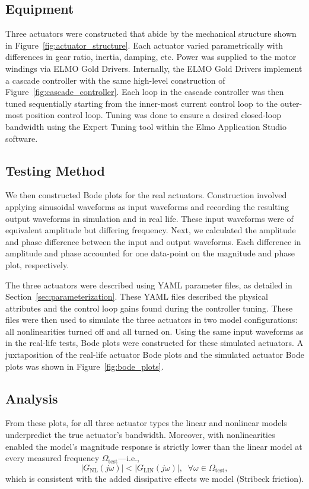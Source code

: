 \documentclass[twocolumn,letterpaper]{IEEEAerospaceCLS}  %
\begin{document}
\subsection{Equipment}
Three actuators were constructed that abide by the mechanical structure shown in Figure~\ref{fig:actuator_structure}. Each actuator varied parametrically with differences in gear ratio, inertia, damping, etc. Power was supplied to the motor windings via ELMO Gold Drivers. Internally, the ELMO Gold Drivers implement a cascade controller with the same high-level construction of Figure~\ref{fig:cascade_controller}. Each loop in the cascade controller was then tuned sequentially starting from the inner-most current control loop to the outer-most position control loop. Tuning was done to ensure a desired closed-loop bandwidth using the Expert Tuning tool within the Elmo Application Studio software.

\subsection{Testing Method}
We then constructed Bode plots for the real actuators. Construction involved applying sinusoidal waveforms as input waveforms and recording the resulting output waveforms in simulation and in real life. These input waveforms were of equivalent amplitude but differing frequency. Next, we calculated the amplitude and phase difference between the input and output waveforms. Each difference in amplitude and phase accounted for one data-point on the magnitude and phase plot, respectively.

The three actuators were described using YAML parameter files, as detailed in Section~\ref{sec:parameterization}. These YAML files described the physical attributes and the control loop gains found during the controller tuning. These files were then used to simulate the three actuators in two model configurations: all nonlinearities turned off and all turned on. Using the same input waveforms as in the real-life tests, Bode plots were constructed for these simulated actuators. A juxtaposition of the real-life actuator Bode plots and the simulated actuator Bode plots was shown in Figure~\ref{fig:bode_plots}.

\subsection{Analysis}
From these plots, for all three actuator types the linear and nonlinear models underpredict the true actuator’s bandwidth. Moreover, with nonlinearities enabled the model’s magnitude response is strictly lower than the linear model at every measured frequency $\Omega_{\text{test}}$—i.e.,
\begin{equation}
  |G_{\mathrm{NL}}(j\omega)| < |G_{\mathrm{LIN}}(j\omega)|,\;\; \forall \omega \in \Omega_{\text{test}},
\end{equation}
which is consistent with the added dissipative effects we model (Stribeck friction). 
\end{document}
